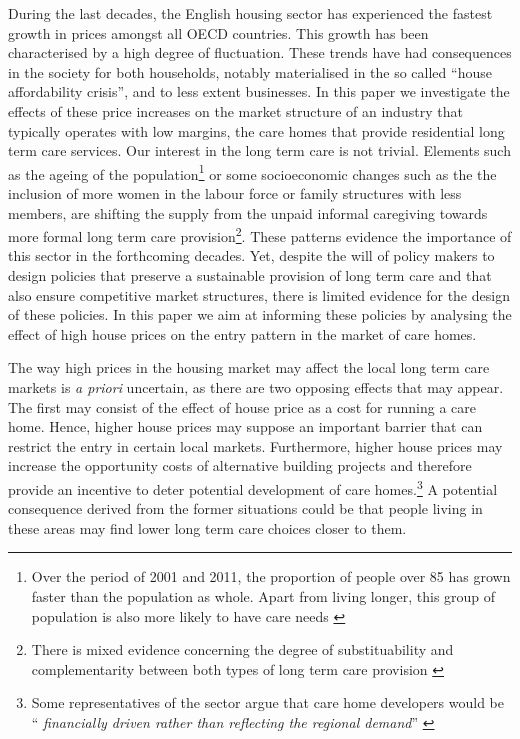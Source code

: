 \documentclass[12pt,letterpaper]{article}
\begin{document}
During the last decades, the English housing sector has experienced
 the fastest growth in prices amongst all OECD countries. This growth has been 
 characterised by a high degree of fluctuation. 
 These trends have had consequences in the society
  for both households, notably materialised in the so called
   “house affordability crisis”, and to less extent businesses. 
   In this paper we investigate the effects
    of these price increases on the market structure 
    of an industry that typically operates with low margins,
     the care homes that provide residential long term care services.
      Our interest in the long term care is not trivial.
       Elements such as the ageing of
        the population\footnote{Over the period of 2001 and 2011,
         the proportion of people over 85 has grown faster than the
          population as whole. Apart from living longer,
           this group of population is also more likely to have
             care needs \citep{nao2014}} or some socioeconomic 
             changes such as the the inclusion of more
              women in the labour force or family 
              structures with less members, are shifting the supply
               from the unpaid informal caregiving towards more formal long
                term care provision\footnote{There is mixed evidence concerning the degree
                 of substituability and complementarity between both types of long term care provision 
                 \citep{van2008informal, bolin2008informal}}. These patterns evidence the importance of this sector in the forthcoming decades.
                  Yet, despite the will of policy makers to design policies that preserve
                   a sustainable provision of long term care and that also ensure competitive
                    market structures, there is limited evidence for the design of these policies. 
                    In this paper we aim at informing these policies by analysing the effect of
                     high house prices on the entry pattern in the market of care homes. 

The way high prices in the housing market may affect the local long term care markets is   \textit{a priori} 
uncertain, as there are two opposing effects that may appear. The first may consist of the effect of house price 
as a cost for running a care home. Hence, higher house prices may suppose an important barrier that can restrict the
 entry in certain local markets. Furthermore, higher house prices may increase the opportunity costs of alternative
 building projects and therefore provide an incentive to deter potential development of care homes.\footnote{Some
 representatives of the sector argue that care home developers would  be `` \textit{financially driven rather than 
 reflecting the regional demand}'' \citep{corbett2015}} 
 A potential consequence derived from the former situations could be that people living in
  these areas may find lower long term care choices closer to them. 
   
\end{document}
